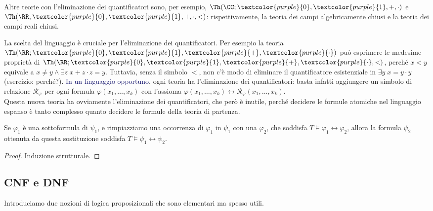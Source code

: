Altre teorie con l'eliminazione dei quantificatori sono, per esempio, $\Th(\CC;\textcolor{purple}{0},\textcolor{purple}{1},+,\cdot)$ e $\Th(\RR;\textcolor{purple}{0},\textcolor{purple}{1},+,\cdot,<)$:
rispettivamente, la teoria dei campi algebricamente chiusi e la teoria dei campi reali chiusi.

\begin{note}
    La scelta del linguaggio è cruciale per l'eliminazione dei quantificatori. Per esempio la teoria $\Th(\RR;\textcolor{purple}{0},\textcolor{purple}{1},\textcolor{purple}{+},\textcolor{purple}{\cdot})$ può
    esprimere le medesime proprietà di $\Th(\RR;\textcolor{purple}{0},\textcolor{purple}{1},\textcolor{purple}{+},\textcolor{purple}{\cdot},<)$, perché $x < y$ equivale a $x \ne y \land \exists z \; x + z\cdot z = y$.
    Tuttavia, senza il simbolo $<$, non c'è modo di eliminare il quantificatore esistenziale in $\exists y \; x = y \cdot y$ (esercizio: perché?). \textcolor{MidnightBlue}{In un linguaggio opportuno}, ogni teoria ha
    l'eliminazione dei quantificatori: basta infatti aggiungere un simbolo di relazione $\mathcal R_\varphi$ per ogni formula $\varphi(x_1,\ldots,x_k)$ con l'assioma $\varphi(x_1,\ldots,x_k) \leftrightarrow \mathcal R_\varphi(x_1,\ldots,x_k)$.\\
    Questa nuova teoria ha ovviamente l'eliminazione dei quantificatori, che però è inutile, perché decidere le formule atomiche nel linguaggio espanso è tanto complesso quanto decidere le formule della teoria di partenza.
\end{note}

\begin{remark}
    Se $\varphi_1$ è una sottoformula di $\psi_1$, e rimpiazziamo una occorrenza di $\varphi_1$ in $\psi_1$ con una $\varphi_2$, che soddisfa $T \models \varphi_1 \leftrightarrow \varphi_2$,
    allora la formula $\psi_2$ ottenuta da questa sostituzione soddisfa $T \models \psi_1 \leftrightarrow \psi_2$.
\end{remark}

\begin{proof}
    Induzione strutturale.
\end{proof}

\subsection{CNF e DNF}

Introduciamo due nozioni di logica proposizionali che sono elementari ma spesso utili.

